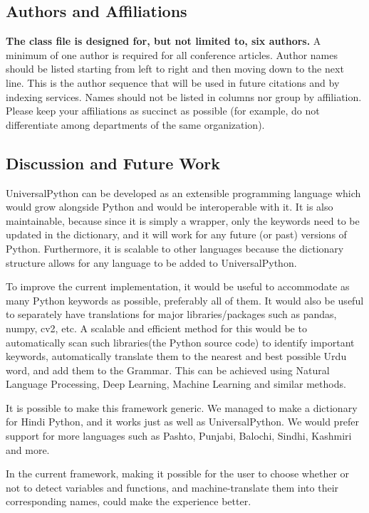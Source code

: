 \documentclass[conference]{IEEEtran}
\begin{document}
\subsection{Authors and Affiliations}
\textbf{The class file is designed for, but not limited to, six authors.} A 
minimum of one author is required for all conference articles. Author names 
should be listed starting from left to right and then moving down to the 
next line. This is the author sequence that will be used in future citations 
and by indexing services. Names should not be listed in columns nor group by 
affiliation. Please keep your affiliations as succinct as possible (for 
example, do not differentiate among departments of the same organization).

\subsection{Discussion and Future Work}

UniversalPython can be developed as an extensible programming language which would grow alongside Python and would be interoperable with it. It is also maintainable, because since it is simply a wrapper, only the keywords need to be updated in the dictionary, and it will work for any future (or past) versions of Python. Furthermore, it is scalable to other languages because the dictionary structure allows for any language to be added to UniversalPython.

To improve the current implementation, it would be useful to accommodate as many Python keywords as possible, preferably all of them. It would also be useful to separately have translations for major libraries/packages such as pandas, numpy, cv2, etc. A scalable and eﬀicient method for this would be to automatically scan such libraries(the Python source code) to identify important keywords, automatically translate them to the nearest and best possible Urdu word, and add them to the Grammar. This can be achieved using Natural Language Processing, Deep Learning, Machine Learning and similar methods.

It is possible to make this framework generic. We managed to make a dictionary for Hindi Python, and it works just as well as UniversalPython. We would prefer support for more languages such as Pashto, Punjabi, Balochi, Sindhi, Kashmiri and more.

In the current framework, making it possible for the user to choose whether or not to detect variables and functions, and machine-translate them into their corresponding names, could make the experience better.
\end{document}

